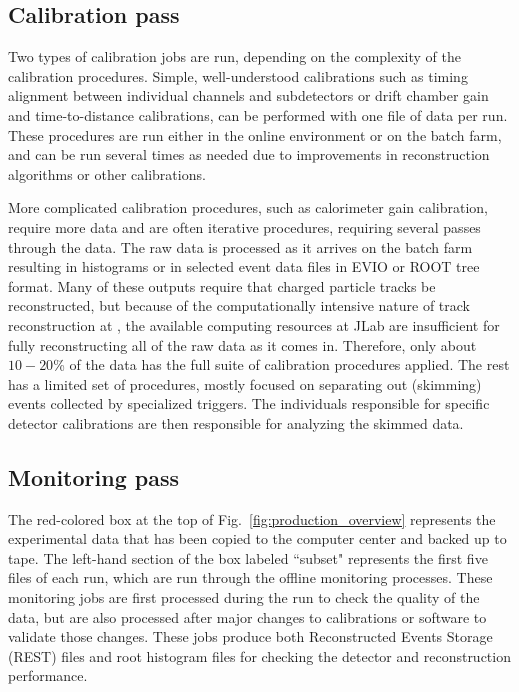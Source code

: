 \subsection{Calibration pass \label{sec:reccalibration}}

Two types of calibration jobs are run, depending on the complexity of the calibration procedures.  Simple, well-understood calibrations such as timing alignment between individual channels and subdetectors or drift chamber gain and time-to-distance calibrations, can be performed with one file of data per run.  These procedures are run either in the online environment or on the batch farm, and can be run several times as needed due to improvements in reconstruction algorithms or other calibrations.

More complicated calibration procedures, such as calorimeter gain calibration, require more data and are often iterative procedures, requiring several passes through the data.  The raw data is processed as it arrives on the batch farm resulting in histograms or in selected event data files in EVIO or ROOT tree format.  Many of these outputs require that charged particle tracks be reconstructed, but because of the computationally intensive nature of track reconstruction at \GX, the available computing resources at JLab are insufficient for fully reconstructing all of the raw data as it comes in.  Therefore, only about $10-20$\% of the data has the full suite of calibration procedures applied.  The rest has a limited set of procedures, mostly focused on separating out (skimming) events collected by specialized triggers. 
The individuals responsible for specific detector calibrations are then responsible for analyzing the skimmed data.

\subsection{Monitoring pass \label{sec:recmonitoring}}

The red-colored box at the top of Fig.~\ref{fig:production_overview} represents the experimental data that has been copied to the computer center and backed up to tape. The left-hand section of the box labeled ``subset" represents the first five files of each run, which are run through the offline monitoring processes. These monitoring jobs are first processed during the run to check the quality of the data, but are also processed after major changes to calibrations or software to validate those changes. These jobs produce both Reconstructed Events Storage (REST) files and root histogram files for checking the detector and reconstruction performance.

